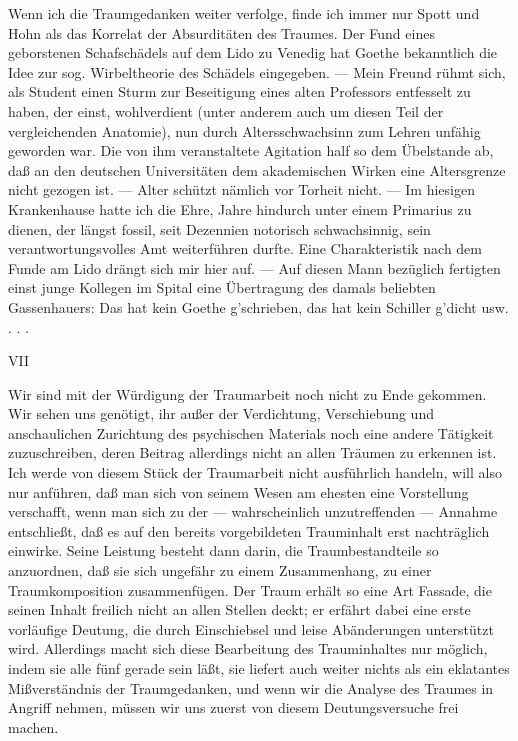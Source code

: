 \documentclass{article}
\begin{document}
            
        \pstart
        Wenn ich die Traumgedanken weiter verfolge, finde ich immer nur Spott und Hohn als das Korrelat der Absurditäten des
                  Traumes. Der Fund eines geborstenen Schafschädels auf dem Lido zu
               Venedig hat Goethe bekanntlich die Idee zur sog.
               Wirbeltheorie des Schädels eingegeben. — Mein Freund rühmt sich, als Student
               einen Sturm zur Beseitigung eines alten Professors entfesselt zu haben, der
               einst, wohlverdient (unter anderem auch um diesen Teil der vergleichenden
               Anatomie), nun durch Altersschwachsinn zum
               Lehren unfähig geworden war. Die von ihm veranstaltete Agitation half so dem
               Übelstande ab, daß an den deutschen Universitäten dem akademischen Wirken
               eine Altersgrenze nicht gezogen ist. — Alter schützt nämlich vor Torheit nicht. — Im hiesigen
               Krankenhause hatte ich die Ehre, Jahre hindurch unter einem Primarius zu
               dienen, der längst fossil, seit Dezennien notorisch
                  schwachsinnig, sein verantwortungsvolles Amt weiterführen durfte. Eine
               Charakteristik nach dem Funde am Lido drängt sich mir hier auf. — Auf diesen
               Mann bezüglich fertigten einst junge Kollegen im Spital eine Übertragung des
               damals beliebten Gassenhauers: Das hat kein Goethe g’schrieben, das hat kein Schiller g’dicht usw. . . .
        \pend
    
         
            
            
            
        \pstart
        VII
        \pend
    
            
        \pstart
        Wir sind mit der Würdigung der Traumarbeit noch nicht zu Ende gekommen. Wir
               sehen uns genötigt, ihr außer der Verdichtung, Verschiebung und
               anschaulichen Zurichtung des psychischen Materials noch eine andere
               Tätigkeit zuzuschreiben, deren Beitrag allerdings nicht an allen Träumen zu
               erkennen ist. Ich werde von diesem Stück der Traumarbeit nicht ausführlich
               handeln, will also nur anführen, daß man sich von seinem Wesen am ehesten eine
               Vorstellung verschafft, wenn man sich zu der — wahrscheinlich unzutreffenden —
               Annahme entschließt, daß es auf den bereits vorgebildeten
                  Trauminhalt erst nachträglich einwirke. Seine Leistung besteht dann
               darin, die Traumbestandteile so anzuordnen, daß sie sich ungefähr zu einem
               Zusammenhang, zu einer Traumkomposition zusammenfügen. Der Traum
               erhält so eine Art Fassade, die seinen Inhalt freilich nicht an allen Stellen
               deckt; er erfährt dabei eine erste vorläufige Deutung, die durch Einschiebsel
               und leise Abänderungen unterstützt wird. Allerdings macht sich diese Bearbeitung
               des Trauminhaltes nur möglich, indem sie alle fünf gerade sein läßt, sie
               liefert auch weiter nichts als ein eklatantes Mißverständnis der Traumgedanken,
               und wenn wir die Analyse des Traumes in Angriff nehmen, müssen wir uns zuerst
               von diesem Deutungsversuche frei machen.
        \pend
    
\end{document}
